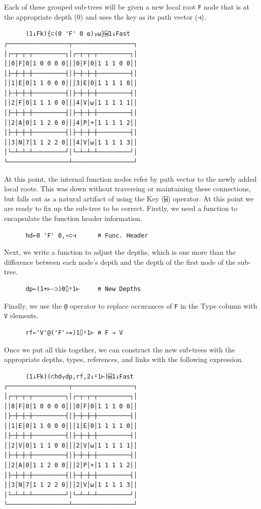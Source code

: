 ﻿\documentclass[numbers,10pt,preprint]{sigplanconf}
\begin{document}
Each of these grouped sub-trees will be given a new local root \verb;F; node that is at the appropriate depth (0) and uses the key as its path vector (\verb;⊣;).

\begin{verbatim}
      (1↓Fk){⊂(0 'F' 0 ⍺)⍪⍵}⌸1↓Fast
┌─────────────────┬─────────────────┐
│┌─┬─┬─┬─────────┐│┌─┬─┬─┬─────────┐│
││0│F│0│1 0 0 0 0│││0│F│0│1 1 1 0 0││
│├─┼─┼─┼─────────┤│├─┼─┼─┼─────────┤│
││1│E│0│1 1 0 0 0│││3│E│0│1 1 1 1 0││
│├─┼─┼─┼─────────┤│├─┼─┼─┼─────────┤│
││2│F│0│1 1 1 0 0│││4│V│⍵│1 1 1 1 1││
│├─┼─┼─┼─────────┤│├─┼─┼─┼─────────┤│
││2│A│0│1 1 2 0 0│││4│P│+│1 1 1 1 2││
│├─┼─┼─┼─────────┤│├─┼─┼─┼─────────┤│
││3│N│7│1 1 2 2 0│││4│V│⍵│1 1 1 1 3││
│└─┴─┴─┴─────────┘│└─┴─┴─┴─────────┘│
└─────────────────┴─────────────────┘ 
\end{verbatim}

\noindent At this point, the internal function nodes refer by path vector to the newly added local roots. This was down without traversing or maintaining these connections, but falls out as a natural artifact of using the Key (\verb;⌸;) operator. At this point we are ready to fix up the sub-tree to be correct. Firstly, we need a function to encapsulate the function header information.

\begin{verbatim}
      hd←0 'F' 0,∘⊂⊣      ⍝ Func. Header
\end{verbatim}

\noindent Next, we write a function to adjust the depths, which is one more than the difference between each node's depth and the depth of the first node of the sub-tree. 

\begin{verbatim}
      dp←(1+⊢-⊃)0⌷⍤1⊢     ⍝ New Depths
\end{verbatim}

\noindent Finally, we use the \verb;@; operator to replace occurances of \verb;F; in the Type column with \verb;V; elements. 

\begin{verbatim}
      rf←'V'@('F'∘=)1⌷⍤1⊢ ⍝ F → V
\end{verbatim}

\noindent Once we put all this together, we can construct the new sub-trees with the appropriate depths, types, references, and links with the following expression.

\begin{verbatim}
      (1↓Fk)(⊂hd⍪dp,rf,2↓⍤1⊢)⌸1↓Fast
┌─────────────────┬─────────────────┐
│┌─┬─┬─┬─────────┐│┌─┬─┬─┬─────────┐│
││0│F│0│1 0 0 0 0│││0│F│0│1 1 1 0 0││
│├─┼─┼─┼─────────┤│├─┼─┼─┼─────────┤│
││1│E│0│1 1 0 0 0│││1│E│0│1 1 1 1 0││
│├─┼─┼─┼─────────┤│├─┼─┼─┼─────────┤│
││2│V│0│1 1 1 0 0│││2│V│⍵│1 1 1 1 1││
│├─┼─┼─┼─────────┤│├─┼─┼─┼─────────┤│
││2│A│0│1 1 2 0 0│││2│P│+│1 1 1 1 2││
│├─┼─┼─┼─────────┤│├─┼─┼─┼─────────┤│
││3│N│7│1 1 2 2 0│││2│V│⍵│1 1 1 1 3││
│└─┴─┴─┴─────────┘│└─┴─┴─┴─────────┘│
└─────────────────┴─────────────────┘
\end{verbatim}
\end{document}

